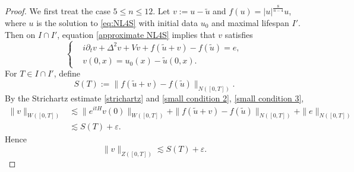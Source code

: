 \documentclass[11pt,a4paper]{article}
\numberwithin{equation}{section}
\begin{document}
\begin{proof}
We first treat the case $5 \leq n \leq 12$.
Let $v := u - \tilde{u}$ and $f(u) = |u|^{\frac{8}{n - 4}}u$, where $u$ is the solution to \eqref{eq:NL4S} with initial data $u_{0}$ and maximal lifespan $I'$.
Then on $I \cap I'$, equation \eqref{approximate NL4S} implies that $v$ satisfies
\[
\left\{
\begin{aligned}
&i\partial_{t}v + \Delta^{2}v + Vv + f(\tilde{u} + v) - f(\tilde{u}) = e, \\
&v(0, x) = u_{0}(x) - \tilde{u}(0, x).
\end{aligned}
\right.
\]
For $T \in I \cap I'$, define
\[
S(T) := \|f(\tilde{u} + v) - f(\tilde{u}) \|_{N([0, T])}.
\]
By the Strichartz estimate \eqref{strichartz} and \eqref{small condition 2}, \eqref{small condition 3},
\begin{equation}\label{es:w norm of v}
\begin{aligned}
\|v\|_{W([0, T])}
&\lesssim \|e^{itH}v(0)\|_{W([0, T])} + \|f(\tilde{u} + v) - f(\tilde{u}) \|_{N([0, T])} + \|e\|_{N([0, T])} \\
&\lesssim S(T) + \varepsilon.
\end{aligned}
\end{equation}
Hence
\begin{equation}\label{es:z norm of v}
 \|v\|_{Z([0, T])} \lesssim S(T) + \varepsilon.
\end{equation}


\end{proof}
\end{document}
